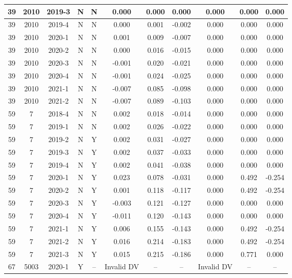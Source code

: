 \begin{landscape}
\begin{longtable}{@{}ccccc|ccc|ccc@{}}
39 & 2010 & 2019-3 & N & N & 0.000 & 0.000 & 0.000 & 0.000 & 0.000 & 0.000 \\* \midrule
39 & 2010 & 2019-4 & N & N & 0.000 & 0.001 & -0.002 & 0.000 & 0.000 & 0.000 \\* \midrule
39 & 2010 & 2020-1 & N & N & 0.001 & 0.009 & -0.007 & 0.000 & 0.000 & 0.000 \\* \midrule
39 & 2010 & 2020-2 & N & N & 0.000 & 0.016 & -0.015 & 0.000 & 0.000 & 0.000 \\* \midrule
39 & 2010 & 2020-3 & N & N & -0.001 & 0.020 & -0.021 & 0.000 & 0.000 & 0.000 \\* \midrule
39 & 2010 & 2020-4 & N & N & -0.001 & 0.024 & -0.025 & 0.000 & 0.000 & 0.000 \\* \midrule
39 & 2010 & 2021-1 & N & N & -0.007 & 0.085 & -0.098 & 0.000 & 0.000 & 0.000 \\* \midrule
39 & 2010 & 2021-2 & N & N & -0.007 & 0.089 & -0.103 & 0.000 & 0.000 & 0.000 \\* \midrule
59 & 7 & 2018-4 & N & N & 0.002 & 0.018 & -0.014 & 0.000 & 0.000 & 0.000 \\* \midrule
59 & 7 & 2019-1 & N & N & 0.002 & 0.026 & -0.022 & 0.000 & 0.000 & 0.000 \\* \midrule
59 & 7 & 2019-2 & N & Y & 0.002 & 0.031 & -0.027 & 0.000 & 0.000 & 0.000 \\* \midrule
59 & 7 & 2019-3 & N & Y & 0.002 & 0.037 & -0.033 & 0.000 & 0.000 & 0.000 \\* \midrule
59 & 7 & 2019-4 & N & Y & 0.002 & 0.041 & -0.038 & 0.000 & 0.000 & 0.000 \\* \midrule
59 & 7 & 2020-1 & N & Y & 0.023 & 0.078 & -0.031 & 0.000 & 0.492 & -0.254 \\* \midrule
59 & 7 & 2020-2 & N & Y & 0.001 & 0.118 & -0.117 & 0.000 & 0.492 & -0.254 \\* \midrule
59 & 7 & 2020-3 & N & Y & -0.003 & 0.121 & -0.127 & 0.000 & 0.000 & 0.000 \\* \midrule
59 & 7 & 2020-4 & N & Y & -0.011 & 0.120 & -0.143 & 0.000 & 0.000 & 0.000 \\* \midrule
59 & 7 & 2021-1 & N & Y & 0.006 & 0.155 & -0.143 & 0.000 & 0.492 & -0.254 \\* \midrule
59 & 7 & 2021-2 & N & Y & 0.016 & 0.214 & -0.183 & 0.000 & 0.492 & -0.254 \\* \midrule
59 & 7 & 2021-3 & N & Y & 0.015 & 0.215 & -0.186 & 0.000 & 0.771 & 0.000 \\* \midrule
67 & 5003 & 2020-1 & Y & -- & Invalid DV & -- & -- & Invalid DV & -- & -- \\* \midrule

\end{longtable}
\end{landscape}
